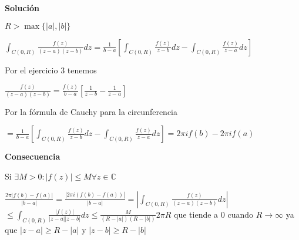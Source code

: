 \textbf{Solución}

$R>\max\{ |a|, |b| \}$

$\int_{C(0,R)} \frac{f(z)}{(z-a)(z-b)}dz = \frac{1}{b-a} \left[ \int_{C(0,R)} \frac{f(z)}{z-b}dz - \int_{C(0,R)} \frac{f(z)}{z-a}dz \right]$

Por el ejercicio 3 tenemos

$\frac{f(z)}{(z-a)(z-b)} = \frac{f(z)}{b-a} \left[ \frac{1}{z-b} - \frac{1}{z-a} \right]$

Por la fórmula de Cauchy para la circunferencia

$= \frac{1}{b-a} \left[ \int_{C(0,R)} \frac{f(z)}{z-b}dz - \int_{C(0,R)} \frac{f(z)}{z-a}dz \right] = 2\pi i f(b) - 2\pi if(a)$

\textbf{Consecuencia}

Si $\exists M>0 : |f(z)|\leq M \forall z \in \mathbb{C}$

$\frac{2\pi |f(b)-f(a)|}{|b-a|} = \frac{|2\pi i(f(b)-f(a))|}{|b-a|} = \left| \int_{C(0,R)} \frac{f(z)}{(z-a)(z-b)} dz \right|$
$\leq \int_{C(0,R)} \frac{|f(z)|}{|z-a||z-b|} dz \leq \frac{M}{(R-|a|)(R-|b|)} 2\pi R$ que tiende a $0$ cuando $R\rightarrow \infty$ ya que $|z-a|\geq R-|a|$ y $|z-b|\geq R - |b|$